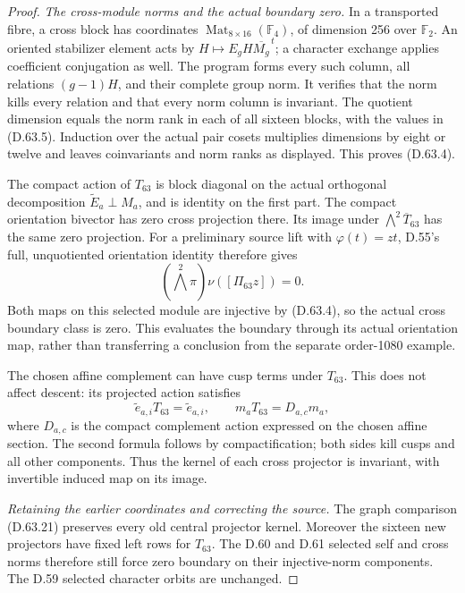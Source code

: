 \begin{proof}
\emph{The cross-module norms and the actual boundary zero.}
In a transported fibre, a cross block has coordinates
\(\operatorname{Mat}_{8\times16}(\mathbb F_4)\),
of dimension 256 over \(\mathbb F_2\). An oriented
stabilizer element acts by
\(H\mapsto E_gH\overline{M_g}^{\,t}\); a character
exchange applies coefficient conjugation as well.
The program 
forms every such column, all relations \((g-1)H\),
and their complete group norm. It verifies that
the norm kills every relation and that every norm
column is invariant. The quotient dimension equals
the norm rank in each of all sixteen blocks,
with the values in (D.63.5). Induction over the
actual pair cosets multiplies dimensions by eight
or twelve and leaves coinvariants and norm ranks
as displayed. This proves (D.63.4).

The compact action of \(T_{63}\) is block diagonal
on the actual orthogonal decomposition
\(\widetilde E_a\perp M_a\), and is identity on
the first part. The compact orientation bivector
has zero cross projection there. Its image under
\(\bigwedge^2\overline T_{63}\) has the same zero
projection. For a preliminary source lift with
\(\varphi(t)=zt\), D.55's full, unquotiented
orientation identity therefore gives
\[
             (\bigwedge^2\pi)\nu([\Pi_{63}z])=0.
 \tag{D.63.23}
\]
Both maps on this selected module are injective
by (D.63.4), so the actual cross boundary class is
zero. This evaluates the boundary through its
actual orientation map, rather than transferring
a conclusion from the separate order-1080 example.

The chosen affine complement can have cusp terms
under \(T_{63}\). This does not affect descent:
its projected action satisfies
\[
 \widetilde e_{a,i}T_{63}=\widetilde e_{a,i},\qquad
 m_aT_{63}=D_{a,c}m_a,
 \tag{D.63.24}
\]
where \(D_{a,c}\) is the compact complement action
expressed on the chosen affine section. The second
formula follows by compactification; both sides
kill cusps and all other components. Thus the
kernel of each cross projector is invariant,
with invertible induced map on its image.

\emph{Retaining the earlier coordinates and correcting the source.}
The graph comparison (D.63.21) preserves every old
central projector kernel. Moreover the sixteen
new projectors have fixed left rows for \(T_{63}\).
The D.60 and D.61 selected self and cross norms
therefore still force zero boundary on their
injective-norm components. The D.59 selected
character orbits are unchanged.


\end{proof}
